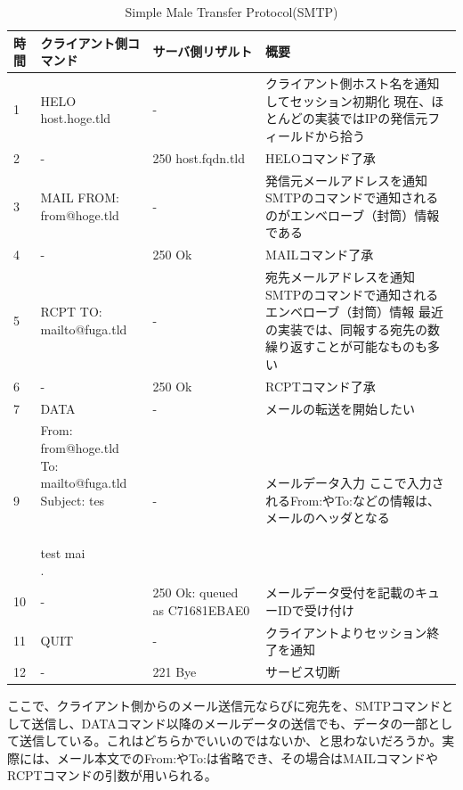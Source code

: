 \begin{table}[hbtp] \caption{Simple Male Transfer Protocol(SMTP)} \label{smtp}
\begin{center}
{\footnotesize
	\begin{tabularx}{13cm}{llXX} \toprule
	時間 & クライアント側コマンド & サーバ側リザルト & 概要 \\ \midrule
	1 & HELO host.hoge.tld & - & クライアント側ホスト名を通知してセッション初期化 現在、ほとんどの実装ではIPの発信元フィールドから拾う \\ \hline
	2 &  -  & 250 host.fqdn.tld & HELOコマンド了承 \\ \hline
	3 & MAIL FROM: from@hoge.tld & -  & 発信元メールアドレスを通知 SMTPのコマンドで通知されるのがエンベローブ（封筒）情報である \\ \hline
	4 & -  & 250 Ok &	MAILコマンド了承 \\ \hline
	5 & RCPT TO: mailto@fuga.tld & - & 宛先メールアドレスを通知 SMTPのコマンドで通知されるエンベローブ（封筒）情報 最近の実装では、同報する宛先の数繰り返すことが可能なものも多い \\ \hline
	6 &  -  & 250 Ok & RCPTコマンド了承 \\ \hline
	7 & DATA & -  & メールの転送を開始したい \\ \hline
	9 & \shortstack{ From: from@hoge.tld \\ To: mailto@fuga.tld \\ Subject: tes \\   \\   \\ test mai \\ . } &  - & メールデータ入力  ここで入力されるFrom:やTo:などの情報は、メールのヘッダとなる \\ \hline
	10 & -  & 250 Ok: queued as C71681EBAE0 & メールデータ受付を記載のキューIDで受け付け \\ \hline
	11 & QUIT & - & クライアントよりセッション終了を通知 \\ \hline
	12 & -  & 221 Bye & サービス切断 \\ \bottomrule
	\end{tabularx}
}
\end{center}
\end{table}


ここで、クライアント側からのメール送信元ならびに宛先を、SMTPコマンドとして送信し、DATAコマンド以降のメールデータの送信でも、データの一部として送信している。これはどちらかでいいのではないか、と思わないだろうか。実際には、メール本文でのFrom:やTo:は省略でき、その場合はMAILコマンドやRCPTコマンドの引数が用いられる。

